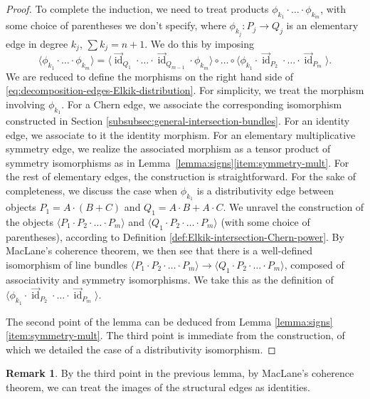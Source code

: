 \documentclass[JEP,XML,SOM,Unicode,published]{cedram}
\theoremstyle{plain}
\theoremstyle{definition}
\newtheorem{remark}[theorem]{Remark}
\DeclareMathOperator{\id}{id}
\begin{document}
\begin{proof}
To complete the induction, we need to treat products $\phi_{k_1} \cdot \ldots \cdot\phi_{k_m}$, with some choice of parentheses we don't specify, where $\phi_{k_j}: P_j \to Q_j$ is an elementary edge in degree $k_j$, $\sum k_j = n+1$. We do this by imposing
\begin{equation}\label{eq:decomposition-edges-Elkik-distribution}
\langle\phi_{k_1}\cdot\ldots\cdot\phi_{k_m}\rangle=\langle\overset{\to}{\id}_{Q_{1}}\cdot\ldots\cdot\overset{\to}{\id}_{Q_{m-1}}\cdot\phi_{k_m}\rangle\circ\ldots\circ\langle\phi_{k_1}\cdot\overset{\to}{\id}_{P_{2}}\cdot\ldots\cdot\overset{\to}{\id}_{P_{m}}\rangle.
\end{equation}
We are reduced to define the morphisms on the right hand side of \eqref{eq:decomposition-edges-Elkik-distribution}. For simplicity, we treat the morphism involving $\phi_{k_{1}}$. For a Chern edge, we associate the corresponding isomorphism constructed in Section \ref{subsubsec:general-intersection-bundles}. For an identity edge, we associate to it the identity morphism. For an elementary multiplicative symmetry edge, we realize the associated morphism as a tensor product of symmetry isomorphisms as in Lem\-ma~\ref{lemma:signs}\eqref{item:symmetry-mult}. For the rest of elementary edges, the construction is straightforward. For the sake of completeness, we discuss the case when $\phi_{k_{1}}$ is a distributivity edge between objects $P_{1}=A\cdot(B+C)$ and $Q_{1}=A\cdot B+A\cdot C$. We unravel the construction of the objects $\langle P_{1}\cdot P_{2}\cdot\ldots\cdot P_{m}\rangle$ and $\langle Q_{1}\cdot P_{2}\cdot\ldots\cdot P_{m}\rangle$ (with some choice of parentheses), according to Definition \ref{def:Elkik-intersection-Chern-power}. By MacLane's coherence theorem, we then see that there is a well-defined isomorphism of line bundles $\langle P_{1}\cdot P_{2}\cdot\ldots\cdot P_{m}\rangle\to \langle Q_{1}\cdot P_{2}\cdot\ldots\cdot P_{m}\rangle$, composed of associativity and symmetry isomorphisms. We take this as the definition of $\langle\phi_{k_1}\cdot\overset{\to}{\id}_{P_{2}}\cdot\ldots\cdot\overset{\to}{\id}_{P_{m}}\rangle$.

The second point of the lemma can be deduced from Lemma \ref{lemma:signs}\eqref{item:symmetry-mult}. The third point is immediate from the construction, of which we detailed the case of a distributivity isomorphism.
\end{proof}

\begin{remark}
By the third point in the previous lemma, by MacLane's coherence theorem, we can treat the images of the structural edges as identities.
\end{remark}
\end{document}
